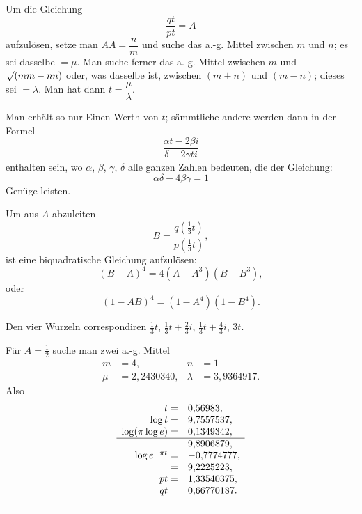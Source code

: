 Um die Gleichung
\[
\frac{qt}{pt}=A
\]
aufzulösen, setze man $AA=\dfrac nm$ und suche das a.-g. Mittel zwischen $m$ und $n$; es sei dasselbe $=\mu$. Man suche ferner das a.-g. Mittel zwischen $m$ und $\mathord{\surd}(mm-nn)$ oder, was dasselbe ist, zwischen $(m+n)$ und $(m-n)$; dieses sei $=\lambda$. Man hat dann $t=\dfrac\mu\lambda$.

Man erhält so nur Einen Werth von $t$; sämmtliche andere werden dann in der Formel
\[
\frac{\alpha t-2\beta i}{\delta-2\gamma ti}
\]
enthalten sein, wo $\alpha$, $\beta$, $\gamma$, $\delta$ alle ganzen Zahlen bedeuten, die der Gleichung:
\[
\alpha\delta-4\beta\gamma=1
\]
Genüge leisten.

Um aus $A$ abzuleiten
\[
B=\dfrac{q\!\left(\frac13t\right)}{p\!\left(\frac13t\right)},
\]
ist eine biquadratische Gleichung aufzulösen:
\[
(B-A)^4=4(A-A^3)(B-B^3),
\]
oder
\[
(1-AB)^4=(1-A^4)(1-B^4).
\]

Den vier Wurzeln correspondiren $\frac13t$, $\frac13t+\frac23i$, $\frac13t+\frac43i$, $3t$.

Für $A=\frac12$ suche man zwei a.-g. Mittel
\[
\begin{aligned}
m&=4, & n&=1\\
\mu&=2{,}2430340, &\lambda&=3{,}9364917.
\end{aligned}
\]
Also
\[
\begin{array}{rl}
t=&0{,}56983,\\
\log t=&9{,}7557537,\\
\log(\pi\log e)=&0{,}1349342,\\\hline
&9{,}8906879,\\
\log e^{-\pi t}=&-0{,}7774777,\\
{}=&9{,}2225223,\\
pt=&1{,}33540375,\\
qt=&0{,}66770187.
\end{array}
\]
\begin{center}\rule{3cm}{.4pt}\end{center}
